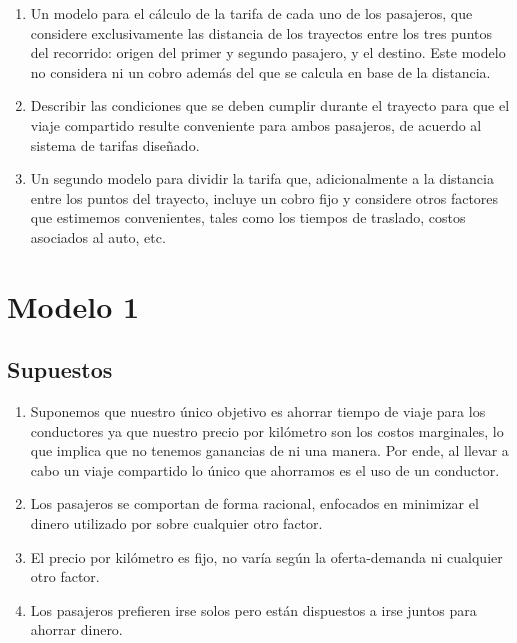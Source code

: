 \documentclass[12pt]{report}
\begin{document}
\begin{enumerate}
    \item Un modelo para el cálculo de la tarifa  de cada uno de los pasajeros, que considere exclusivamente las distancia de los trayectos entre los tres puntos del recorrido: origen del primer y segundo pasajero, y el destino. Este modelo no considera ni un cobro además del que se calcula en base de la distancia. 
    
    \item Describir las condiciones que se deben cumplir durante el trayecto para que el viaje compartido resulte conveniente para ambos pasajeros, de acuerdo al sistema de tarifas diseñado. 
    
    \item Un segundo modelo para dividir la tarifa que, adicionalmente a la distancia entre los puntos del trayecto, incluye un cobro fijo y considere otros factores que estimemos convenientes, tales como los tiempos de traslado, costos asociados al auto, etc.
\end{enumerate}



\section*{Modelo 1}


\subsection*{Supuestos}
\begin{enumerate}
    \item Suponemos que nuestro único objetivo es ahorrar tiempo de viaje para los conductores ya que nuestro precio por kilómetro son los costos marginales, lo que implica que no tenemos ganancias de ni una manera. Por ende, al llevar a cabo un viaje compartido lo único que ahorramos es el uso de un conductor.
    \item Los pasajeros se comportan de forma racional, enfocados en minimizar el dinero utilizado por sobre cualquier otro factor. 
    \item El precio por kilómetro es fijo, no varía según la oferta-demanda ni cualquier otro factor.
    \item Los pasajeros prefieren irse solos pero están dispuestos a irse juntos para ahorrar dinero.
\end{enumerate}
\end{document}
